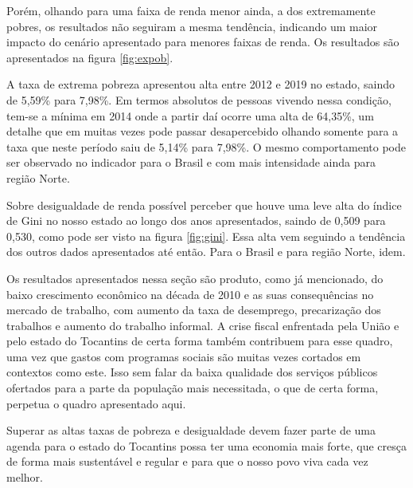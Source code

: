 \par Porém, olhando para uma faixa de renda menor ainda, a dos extremamente pobres, os resultados não seguiram a mesma tendência, indicando um maior impacto do cenário apresentado para menores faixas de renda. Os resultados são apresentados na figura \ref{fig:expob}.
\par A taxa de extrema pobreza apresentou alta entre 2012 e 2019 no estado, saindo de 5,59\% para 7,98\%. Em termos absolutos de pessoas vivendo nessa condição, tem-se a mínima em 2014 onde a partir daí ocorre uma alta de 64,35\%, um detalhe que em muitas vezes pode passar desapercebido olhando somente para a taxa que neste período saiu de 5,14\% para 7,98\%. O mesmo comportamento pode ser observado no indicador para o Brasil e  com mais intensidade ainda para região Norte.

\par Sobre desigualdade de renda possível perceber que houve uma leve alta do índice de Gini no nosso estado ao longo dos anos apresentados, saindo de 0,509 para 0,530, como pode ser visto na figura \ref{fig:gini}. Essa alta vem seguindo a tendência dos outros dados apresentados até então. Para o Brasil e para região Norte, idem. 
\par Os resultados apresentados nessa seção são produto, como já mencionado, do baixo crescimento econômico na década de 2010 e as suas consequências no mercado de trabalho, com aumento da taxa de desemprego, precarização dos trabalhos e aumento do trabalho informal. A crise fiscal enfrentada pela União e pelo estado do Tocantins de certa forma também contribuem para esse quadro, uma vez que gastos com programas sociais são muitas vezes cortados em contextos como este. Isso sem falar da baixa qualidade dos serviços públicos ofertados para a parte da população mais necessitada, o que de certa forma, perpetua o quadro apresentado aqui.
\par Superar as altas taxas de pobreza e desigualdade devem fazer parte de uma agenda para o estado do Tocantins possa ter uma economia mais forte, que cresça de forma mais sustentável e regular e para que o nosso povo viva cada vez melhor.

